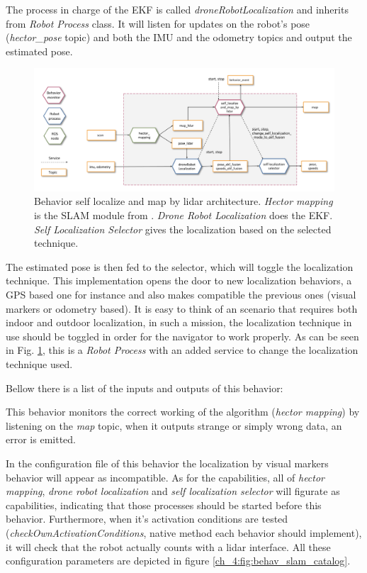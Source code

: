   The process in charge of the EKF is called \textit{droneRobotLocalization} and inherits from \textit{Robot Process} class. It will listen for updates on the robot's pose (\textit{hector\_pose} topic) and both the IMU and the odometry topics and output the estimated pose.

  \begin{figure}[h] 
    \centering
    \includegraphics[width=\textwidth]{./Figures/BehaviorSlamArquitecture.png}
    \caption{Behavior self localize and map by lidar architecture. \textit{Hector mapping} is the SLAM module from \cite{hector_slam}. \textit{Drone Robot Localization} does the EKF. \textit{Self Localization Selector} gives the localization based on the selected technique.}
    \label{ch_4:fig:behav_slam}
  \end{figure}

  The estimated pose is then fed to the selector, which will toggle the localization technique. This implementation opens the door to new localization behaviors, a GPS based one for instance and also makes compatible the previous ones (visual markers or odometry based). It is easy to think of an scenario that requires both indoor and outdoor localization, in such a mission, the localization technique in use should be toggled in order for the navigator to work properly. As can be seen in Fig. \ref{ch_4:fig:behav_slam}, this is a \textit{Robot Process} with an added service to change the localization technique used.

  Bellow there is a list of the inputs and outputs of this behavior:

  

  This behavior monitors the correct working of the algorithm (\textit{hector mapping}) by listening on the \textit{map} topic, when it outputs strange or simply wrong data, an error is emitted.

  In the configuration file of this behavior the localization by visual markers behavior will appear as incompatible. As for the capabilities, all of \textit{hector mapping}, \textit{drone robot localization} and \textit{self localization selector} will figurate as capabilities, indicating that those processes should be started before this behavior. Furthermore, when it's activation conditions are tested (\textit{checkOwnActivationConditions}, native method each behavior should implement), it will check that the robot actually counts with a lidar interface. All these configuration parameters are depicted in figure \ref{ch_4:fig:behav_slam_catalog}.

